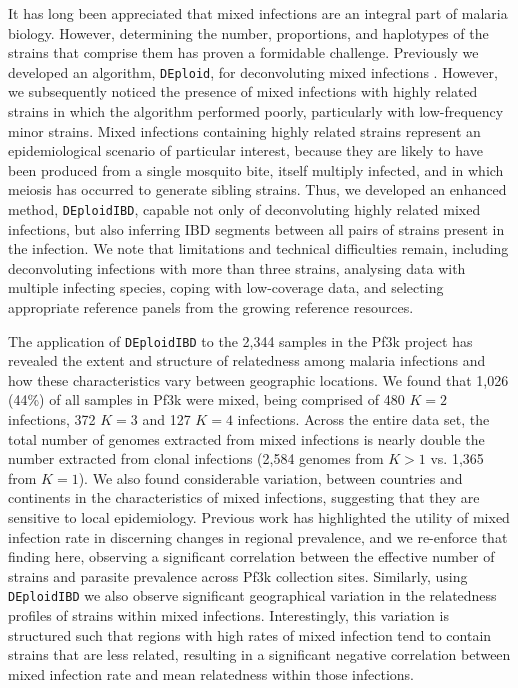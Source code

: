 \documentclass[9pt,lineno]{elife}
\begin{document}
It has long been appreciated that mixed infections are an integral part of malaria biology.  However, determining the number, proportions, and haplotypes of the strains that comprise them has proven a formidable challenge.  Previously we developed an algorithm, \texttt{DEploid}, for deconvoluting mixed infections \citep{Zhu2017}.  However, we subsequently noticed the presence of mixed infections with highly related strains in which the algorithm performed poorly, particularly with low-frequency minor strains.  Mixed infections containing highly related strains represent an epidemiological scenario of particular interest, because they are likely to have been produced from a single mosquito bite, itself multiply infected, and in which meiosis has occurred to generate sibling strains. Thus, we developed an enhanced method, \texttt{DEploidIBD}, capable not only of deconvoluting highly related mixed infections, but also inferring IBD segments between all pairs of strains present in the infection.  We note that limitations and technical difficulties remain, including deconvoluting infections with more than three strains, analysing data with multiple infecting species, coping with low-coverage data, and selecting appropriate reference panels from the growing reference resources.

The application of \texttt{DEploidIBD} to the 2,344 samples in the Pf3k project has revealed the extent and structure of relatedness among malaria infections and how these characteristics vary between geographic locations. We found that 1,026 (44\%) of all samples in Pf3k were mixed, being comprised of 480 $K=2$ infections, 372 $K=3$ and 127 $K=4$ infections. Across the entire data set, the total number of genomes extracted from mixed infections is nearly double the number extracted from clonal infections (2,584 genomes from $K>1$ vs. 1,365 from $K=1$).  We also found considerable variation, between countries and continents in the characteristics of mixed infections, suggesting that they are sensitive to local epidemiology.  Previous work has highlighted the utility of mixed infection rate in discerning changes in regional prevalence, and we re-enforce that finding here, observing a significant correlation between the effective number of strains and parasite prevalence across Pf3k collection sites. Similarly, using \texttt{DEploidIBD} we also observe significant geographical variation in the relatedness profiles of strains within mixed infections.  Interestingly, this variation is structured such that regions with high rates of mixed infection tend to contain strains that are less related, resulting in a significant negative correlation between mixed infection rate and mean relatedness within those infections.
\end{document}
